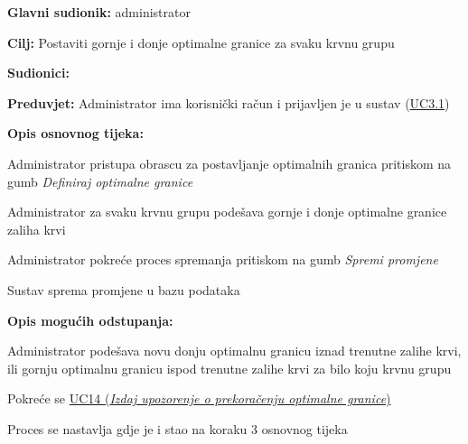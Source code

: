 					
					\noindent {}
					\begin{packed_item} \label{UC9}
	
						\item \textbf{Glavni sudionik: }administrator
						\item  \textbf{Cilj:} Postaviti gornje i donje optimalne granice za svaku krvnu grupu
						\item  \textbf{Sudionici:} 
						\item  \textbf{Preduvjet:} Administrator ima korisnički račun i prijavljen je u sustav (\hyperref[UC3.1]{UC3.1})
						\item  \textbf{Opis osnovnog tijeka:}
						
						\item[] \begin{packed_enum}
							\item Administrator pristupa obrascu za postavljanje optimalnih granica pritiskom na gumb \textit{Definiraj optimalne granice}
	                        \item Administrator za svaku krvnu grupu podešava gornje i donje optimalne granice zaliha krvi
	                        \item Administrator pokreće proces spremanja pritiskom na gumb \textit{Spremi promjene}
	                        \item Sustav sprema promjene u bazu podataka
						\end{packed_enum}
						
						\item  \textbf{Opis mogućih odstupanja:}
						
						\item[] \begin{packed_item}
	
							\item[3] Administrator podešava novu donju optimalnu granicu iznad trenutne zalihe krvi, ili gornju optimalnu granicu ispod trenutne zalihe krvi za bilo koju krvnu grupu
							\item[] \begin{packed_enum}
                                \item Pokreće se \hyperref[UC14]{UC14 (\textit{Izdaj upozorenje o prekoračenju optimalne granice})}
                                \item Proces se nastavlja gdje je i stao na koraku 3 osnovnog tijeka
							\end{packed_enum}

						\end{packed_item}
						
					\end{packed_item}
					
